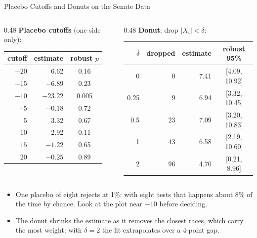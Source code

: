 \documentclass[aspectratio=169,11pt,xcolor=dvipsnames]{beamer}
\begin{document}
\begin{frame}{Placebo Cutoffs and Donuts on the Senate Data}
\begin{columns}[T]
\begin{column}{0.48\linewidth}
\textbf{Placebo cutoffs} (one side only):
\vskip2pt
\begin{center}\footnotesize
\renewcommand{\arraystretch}{1.05}
\begin{tabular}{@{}rrc@{}}
\toprule
cutoff & estimate & robust $p$ \\
\midrule
$-20$ & 6.62 & 0.16 \\
$-15$ & $-6.89$ & 0.23 \\
$-10$ & $-23.22$ & \alert{0.005} \\
$-5$ & $-0.18$ & 0.72 \\
$5$ & 3.32 & 0.67 \\
$10$ & 2.92 & 0.11 \\
$15$ & $-1.22$ & 0.65 \\
$20$ & $-0.25$ & 0.89 \\
\bottomrule
\end{tabular}
\end{center}
\end{column}
\begin{column}{0.48\linewidth}
\textbf{Donut}: drop $|X_i| < \delta$:
\vskip2pt
\begin{center}\footnotesize
\renewcommand{\arraystretch}{1.05}
\begin{tabular}{@{}rrrc@{}}
\toprule
$\delta$ & dropped & estimate & robust 95\% \\
\midrule
0 & 0 & 7.41 & [4.09, 10.92] \\
0.25 & 9 & 6.94 & [3.32, 10.45] \\
0.5 & 23 & 7.09 & [3.20, 10.83] \\
1 & 43 & 6.58 & [2.19, 10.60] \\
2 & 96 & 4.70 & [0.21, 8.96] \\
\bottomrule
\end{tabular}
\end{center}
\end{column}
\end{columns}
\vskip6pt
\begin{itemize}\itemsep2pt
  \item One placebo of eight rejects at 1\%: with eight tests that happens about
        8\% of the time by chance. Look at the plot near $-10$ before deciding.
  \item The donut shrinks the estimate as it removes the closest races, which
        carry the most weight; with $\delta = 2$ the fit extrapolates over a
        4-point gap.
\end{itemize}
\end{frame}
\end{document}

